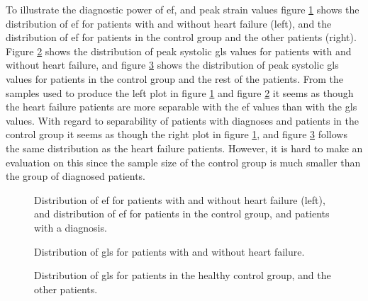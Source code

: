 To illustrate the diagnostic power of \acrshort{ef}, and peak strain values figure \ref{fig:ef_hf_ind_dist} 
shows the distribution of \acrshort{ef} for patients with and without heart failure (left), and the distribution of \acrshort{ef} for patients in the control group and the other patients (right). 
Figure \ref{fig:gls_hf_dist} shows the distribution of peak systolic \acrshort{gls} values for patients with and without heart failure, 
and figure \ref{fig:gls_ind_dist} shows the distribution of peak systolic \acrshort{gls} values for patients in the control group and the rest of the patients. 
From the samples used to produce the left plot in figure \ref{fig:ef_hf_ind_dist} and figure \ref{fig:gls_hf_dist} 
it seems as though the heart failure patients are more separable with the \acrshort{ef} values than with the \acrshort{gls} values. 
With regard to separability of patients with diagnoses and patients in the control group it seems as though the right plot in figure \ref{fig:ef_hf_ind_dist}, 
and figure \ref{fig:gls_ind_dist} follows the same distribution as the heart failure patients. 
However, it is hard to make an evaluation on this since the sample size of the control group is much smaller than the group of diagnosed patients.\bigskip

\begin{figure}[h]
    \centering
    
    \caption{Distribution of \acrshort{ef} for patients with and without heart failure (left), and distribution of \acrshort{ef} for patients in the control group, and patients with a diagnosis.}
    \label{fig:ef_hf_ind_dist}
\end{figure}

\begin{figure}[h]
    \centering
    
    \caption{Distribution of \acrshort{gls} for patients with and without heart failure.}
    \label{fig:gls_hf_dist}
\end{figure}

\begin{figure}[!h]
    \centering
    
    \caption{Distribution of \acrshort{gls} for patients in the healthy control group, and the other patients.}
    \label{fig:gls_ind_dist}
\end{figure}

